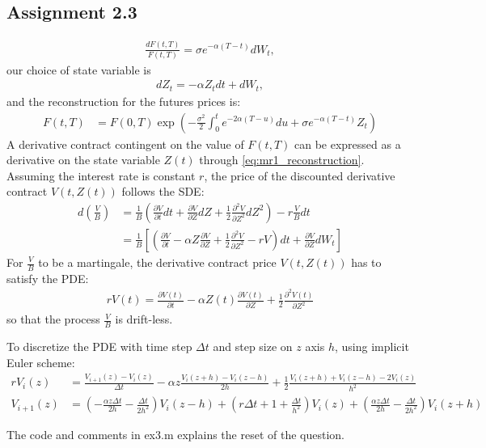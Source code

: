 \documentclass[11pt,a4paper,hidelinks,fleqn]{article}            %
\begin{document}
\subsection*{Assignment 2.3}
\begin{align*}
\frac{dF(t, T)}{F(t, T)} = \sigma e^{-\alpha (T- t)} dW_t,
\end{align*}
our choice of state variable is
\begin{align}
dZ_t = -\alpha Z_t dt + dW_t,
\end{align}
and the reconstruction for the futures prices is:
\begin{align}
F(t, T) & = F(0, T) \exp\left( -\frac{\sigma^2}{2} \int_0^t e^{-2\alpha (T - u)} du + \sigma e^{-\alpha(T-t)} Z_t \right)
\label{eq:mr1_reconstruction}
\end{align}
A derivative contract contingent on the value of $F(t, T)$ can be expressed as a derivative on the state variable $Z(t)$ through \eqref{eq:mr1_reconstruction}.
Assuming the interest rate is constant $r$,
the price of the discounted derivative contract $V(t, Z(t))$ follows the SDE:
\begin{align}
d\left(\frac{V}{B}\right) & = \frac{1}{B}\left(\frac{\partial V}{\partial t} dt + \frac{\partial V}{\partial Z} dZ + \frac{1}{2}\frac{\partial^2 V}{\partial Z^2} dZ^2 \right) - r\frac{V}{B}dt  \\
   & = \frac{1}{B} \left[\left(\frac{\partial V}{\partial t} - \alpha Z\frac{\partial V}{\partial Z} + \frac{1}{2} \frac{\partial^2 V}{\partial Z^2} - rV\right)dt + \frac{\partial V}{\partial Z} dW_t \right]
\end{align}
For $\frac{V}{B}$ to be a martingale, the derivative contract price $V(t, Z(t))$ has to satisfy the PDE:
\begin{align}
rV(t) = \frac{\partial V(t)}{\partial t} - \alpha Z(t) \frac{\partial V(t)}{\partial Z} + \frac{1}{2} \frac{\partial^2 V(t)}{\partial Z^2}
\end{align}
so that the process $\frac VB$ is drift-less.

To discretize the PDE with time step $\Delta t$ and step size on $z$ axis $h$, using implicit Euler scheme:
\begin{align*}
rV_i(z) & = \frac{V_{i+1}(z) - V_i(z)}{\Delta t} - \alpha z \frac{V_i(z+h) - V_i(z-h)}{2h} + \frac12 \frac{V_i(z+h) + V_i(z-h) - 2V_i(z)}{h^2} \\
V_{i+1}(z) & = \left(-\frac{\alpha z \Delta t}{2h} - \frac{\Delta t}{2h^2}\right) V_i(z-h) + \left(r \Delta t + 1 + \frac{\Delta t}{h^2}\right) V_i(z) + \left(\frac{\alpha z \Delta t}{2h} - \frac{\Delta t}{2h^2}\right) V_i(z+h) 
\end{align*}

The code and comments in ex3.m explains the reset of the question.
\end{document}
